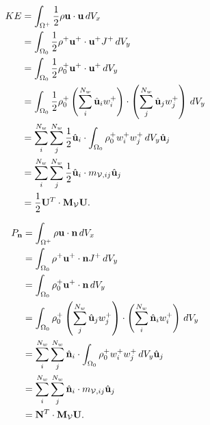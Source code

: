 \documentclass[11pt]{report}
\begin{document}
\begin{align}
    KE &= \int_{\Omega^+} \frac{1}{2} \rho \mathbf{u} \cdot \mathbf{u} \, dV_x \nonumber \\
    &= \int_{\Omega_0} \frac{1}{2} \rho^+ \mathbf{u}^+ \cdot \mathbf{u}^+ J^+ \, dV_y \nonumber \\
    &= \int_{\Omega_0} \frac{1}{2} \rho_0^+ \mathbf{u}^+ \cdot \mathbf{u}^+ \, dV_y \nonumber \\
    &= \int_{\Omega_0} \frac{1}{2} \rho_0^+ \left ( \sum_i^{N_w} \hat{\mathbf{u}}_i w_i^+ \right ) \cdot \left ( \sum_j^{N_w} \hat{\mathbf{u}}_j w_j^+ \right ) \, dV_y \nonumber \\
    &= \sum_i^{N_w} \sum_j^{N_w} \frac{1}{2} \hat{\mathbf{u}}_i \cdot \int_{\Omega_0}\rho_0^+ w_i^+ w_j^+ \, dV_y \hat{\mathbf{u}}_j \nonumber \\
    &= \sum_i^{N_w} \sum_j^{N_w} \frac{1}{2} \hat{\mathbf{u}}_i \cdot m_{\mathcal{V},ij} \hat{\mathbf{u}}_j \nonumber \\
    &= \frac{1}{2} \mathbf{U}^T \cdot \mathbf{M}_\mathcal{V} \mathbf{U}.
\end{align}

\begin{align}
    P_{\mathbf{n}} &= \int_{\Omega^+} \rho \mathbf{u} \cdot \mathbf{n} \, dV_x \nonumber \\
    &= \int_{\Omega_0} \rho^+ \mathbf{u}^+ \cdot \mathbf{n} J^+ \, dV_y \nonumber \\
    &= \int_{\Omega_0} \rho^+_0 \mathbf{u}^+ \cdot \mathbf{n} \, dV_y \nonumber \\
    &= \int_{\Omega_0} \rho^+_0 \left ( \sum_j^{N_w} \hat{\mathbf{u}}_j w^+_j \right ) \cdot \left ( \sum_i^{N_w} \hat{\mathbf{n}}_i w_i^+ \right ) \, dV_y \nonumber \\
    &= \sum_i^{N_w} \sum_j^{N_w} \hat{\mathbf{n}}_i \cdot \int_{\Omega_0} \rho_0^+ w_i^+ w_j^+ \, dV_y \hat{\mathbf{u}}_j \nonumber \\
    &= \sum_i^{N_w} \sum_j^{N_w} \hat{\mathbf{n}}_i \cdot m_{\mathcal{V},ij} \hat{\mathbf{u}}_j \nonumber \\
    &= \mathbf{N}^T \cdot \mathbf{M}_\mathcal{V} \mathbf{U}.
\end{align}
\end{document}
